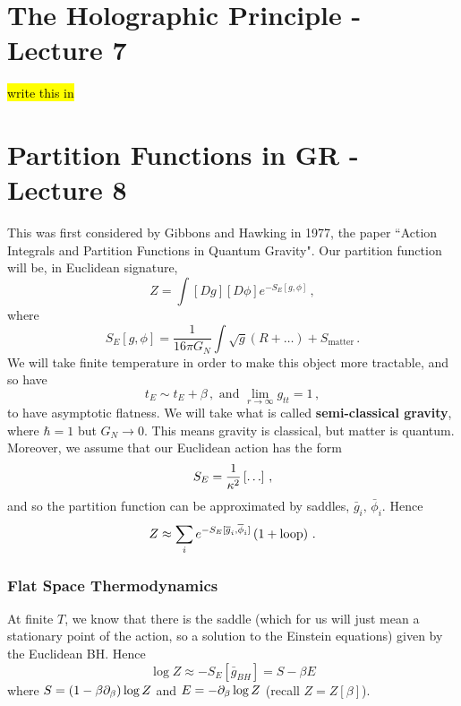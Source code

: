 \documentclass{article}
\begin{document}
\section{The Holographic Principle - Lecture 7}
\hl{write this in}

\section{Partition Functions in GR - Lecture 8}
This was first considered by Gibbons and Hawking in 1977, the paper ``Action Integrals and Partition Functions in Quantum Gravity". Our partition function will be, in Euclidean signature, 
\[
Z = \int [Dg][D\phi] e^{-S_E[g, \phi]} \, ,
\]
where 
\[
S_E[g, \phi] = \frac{1}{16 \pi G_N} \int \sqrt{g}(R + \dots) + S_{\text{matter}} \, . 
\]
We will take finite temperature in order to make this object more tractable, and so have 
\[
t_E \sim t_E + \beta \, , \text{ and } \lim_{r \to \infty} g_{tt} = 1 \, ,
\]
to have asymptotic flatness. We will take what is called \textbf{semi-classical gravity}, where $\hbar =1$ but $G_N \to 0$. This means gravity is classical, but matter is quantum. \\
Moreover, we assume that our Euclidean action has the form 
\[
S_E = \frac{1}{\kappa^2}\psquare{\dots} \, , 
\]
and so the partition function can be approximated by saddles, $\bar{g}_i, \, \bar{\phi}_i$. Hence 
\[
Z \approx \sum_i e^{-S_E[\overline{g}_i, \overline{\phi}_i]} \left( 1+ \text{loop} \right) \, .
\]
\subsubsection{Flat Space Thermodynamics} 
At finite $T$, we know that there is the saddle (which for us will just mean a stationary point of the action, so a solution to the Einstein equations) given by the Euclidean BH. Hence 
\[
\log Z \approx -S_E[\bar{g}_{BH}] = S-\beta E
\]
where $S = (1-\beta \partial_\beta) \log Z$ and $E = - \partial_\beta \log Z$ (recall $Z=Z[\beta]$).  

\end{document}
